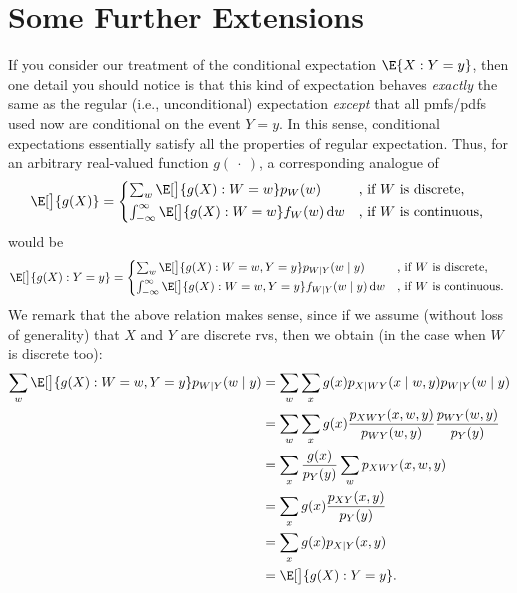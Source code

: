 \section{Some Further Extensions}
If you consider our treatment of the conditional expectation $ \E{X\given Y=y} $, then
one detail you should notice is that this kind of expectation behaves \emph{exactly}
the same as the regular (i.e., unconditional) expectation \emph{except}
that all pmfs/pdfs used now are conditional on the event $ Y=y $. In this sense,
conditional expectations essentially satisfy all the properties of regular expectation.
Thus, for an arbitrary real-valued function $ g(\:\cdot\:) $, a corresponding analogue
of
\[ \E[\big]{g(X)}=\begin{cases*}
        \sum_w \E[\big]{g(X)\given W=w}p_W(w)                         & , if $ W $ is discrete,   \\
        \int_{-\infty}^{\infty}\E[\big]{g(X)\given W=w}f_W(w)\odif{w} & , if $ W $ is continuous,
    \end{cases*} \]
would be
\[ \E[\big]{g(X)\given Y=y}=\begin{cases*}
        \sum_w \E[\big]{g(X)\given W=w, Y=y}p_{W\mid Y}(w\mid y)                         & , if $ W $ is discrete,   \\
        \int_{-\infty}^{\infty}\E[\big]{g(X)\given W=w, Y=y}f_{W\mid Y}(w\mid y)\odif{w} & , if $ W $ is continuous.
    \end{cases*} \]
We remark that the above relation makes sense, since if we assume (without loss of generality)
that $ X $ and $ Y $ are discrete rvs, then we obtain (in the case when $ W $ is discrete too):
\begin{align*}
    \sum_{w} \E[\big]{g(X) \given W=w, Y=y} p_{W \mid Y}(w \mid y)
     & =\sum_{w} \sum_{x} g(x) p_{X \mid W Y}(x \mid w, y) p_{W \mid Y}(w \mid y)                      \\
     & =\sum_{w} \sum_{x} g(x) \frac{p_{X W Y}(x, w, y)}{p_{W Y}(w, y)} \frac{p_{W Y}(w, y)}{p_{Y}(y)} \\
     & =\sum_{x} \frac{g(x)}{p_{Y}(y)} \sum_{w} p_{X W Y}(x, w, y)                                     \\
     & =\sum_{x} g(x) \frac{p_{X Y}(x, y)}{p_{Y}(y)}                                                   \\
     & =\sum_{x} g(x) p_{X \mid Y}(x, y)                                                               \\
     & =\E[\big]{g(X)\given Y=y}.
\end{align*}
